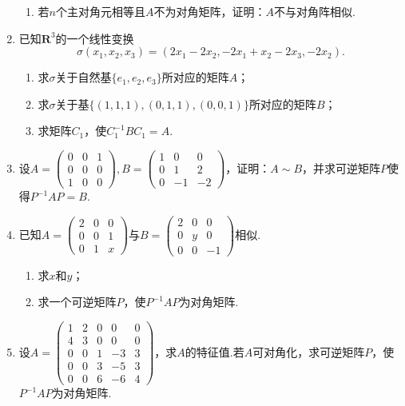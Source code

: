 \begin{enumerate}
\begin{enumerate}[label=(\arabic*)]
        \item 若$n$个主对角元相等且$A$不为对角矩阵，证明：$A$不与对角阵相似.
    \end{enumerate}
    \item 已知$\mathbf{R}^3$的一个线性变换
	\[\sigma(x_1,x_2,x_3)=(2x_1-2x_2,-2x_1+x_2-2x_3,-2x_2).\]
    \begin{enumerate}[label=(\arabic*)]
        \item 求$\sigma$关于自然基$\{e_1,e_2,e_3\}$所对应的矩阵$A$；
        \item 求$\sigma$关于基$\{(1,1,1),(0,1,1),(0,0,1)\}$所对应的矩阵$B$；
        \item 求矩阵$C_1$，使$C_1^{-1}BC_1=A$.
    \end{enumerate}
	\item 设$A=\begin{pmatrix}
		0 & 0 & 1 \\ 0 & 0 & 0 \\ 1 & 0 & 0
	\end{pmatrix},B=\begin{pmatrix}
		1 & 0 & 0 \\ 0 & 1 & 2 \\ 0 & -1 & -2
	\end{pmatrix}$，证明：$A\sim B$，并求可逆矩阵$P$使得$P^{-1}AP=B$.
	\item 已知$A=\begin{pmatrix}
		2 & 0 & 0 \\ 0 & 0 & 1 \\ 0 & 1 & x
	\end{pmatrix}$与$B=\begin{pmatrix}
		2 & 0 & 0 \\ 0 & y & 0 \\ 0 & 0 & -1
	\end{pmatrix}$相似.
    \begin{enumerate}
        \item 求$x$和$y$；
        \item 求一个可逆矩阵$P$，使$P^{-1}AP$为对角矩阵.
    \end{enumerate}
	\item 设$A=\begin{pmatrix}
		1 & 2 & 0 & 0 & 0 \\ 4 & 3 & 0 & 0 & 0 \\ 0 & 0 & 1 & -3 & 3 \\ 0 & 0 & 3 & -5 & 3 \\ 
		0 & 0 & 6 & -6 & 4
	\end{pmatrix}$，求$A$的特征值.若$A$可对角化，求可逆矩阵$P$，使$P^{-1}AP$为对角矩阵.

\end{enumerate}
